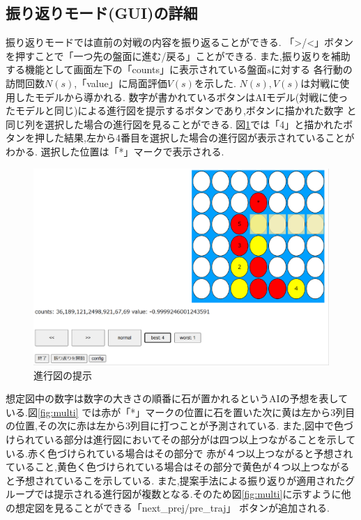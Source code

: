 \subsection{振り返りモード(GUI)の詳細}
振り返りモードでは直前の対戦の内容を振り返ることができる.
「>/<」ボタンを押すことで「一つ先の盤面に進む/戻る」ことができる.
また,振り返りを補助する機能として画面左下の「counts」に表示されている盤面$s$に対する
各行動の訪問回数$N(s)$,「value」に局面評価$V(s)$を示した.
$N(s),V(s)$は対戦に使用したモデルから導かれる.
数字が書かれているボタンはAIモデル(対戦に使ったモデルと同じ)による進行図を提示するボタンであり,ボタンに描かれた数字
と同じ列を選択した場合の進行図を見ることができる.
図\ref{fig:number-button}では「4」と描かれたボタンを押した結果,左から4番目を選択した場合の進行図が表示されていることがわかる.
選択した位置は「*」マークで表示される.
\begin{figure}[t]
	\centering
    \includegraphics[width=\linewidth]{./figure/trajSystem.pdf}
	\caption{進行図の提示}
	\label{fig:number-button}
\end{figure}
想定図中の数字は数字の大きさの順番に石が置かれるというAIの予想を表している.図\ref{fig:multi}
では赤が「*」マークの位置に石を置いた次に黄は左から3列目の位置,その次に赤は左から3列目に打つことが予測されている.
また,図中で色づけられている部分は進行図においてその部分がは四つ以上つながることを示している.赤く色づけられている場合はその部分で
赤が４つ以上つながると予想されていること,黄色く色づけられている場合はその部分で黄色が４つ以上つながると予想されているこを示している.
また,提案手法による振り返りが適用されたグループでは提示される進行図が複数となる.そのため図\ref{fig:multi}に示すように他の想定図を見ることができる「next\_prej/pre\_traj」
ボタンが追加される.
